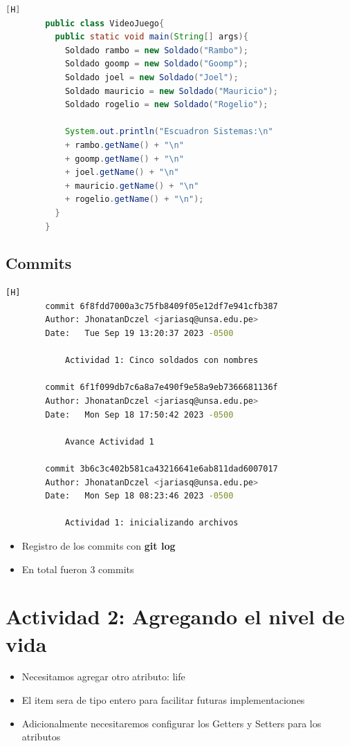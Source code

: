 \documentclass{article}
\begin{document}
	\begin{lstlisting}[language=java,caption={Creando el archivo VideoJuego.java}][H]
        public class VideoJuego{
          public static void main(String[] args){
            Soldado rambo = new Soldado("Rambo");
            Soldado goomp = new Soldado("Goomp");
            Soldado joel = new Soldado("Joel");
            Soldado mauricio = new Soldado("Mauricio");
            Soldado rogelio = new Soldado("Rogelio");
            
            System.out.println("Escuadron Sistemas:\n" 
            + rambo.getName() + "\n" 
            + goomp.getName() + "\n" 
            + joel.getName() + "\n" 
            + mauricio.getName() + "\n" 
            + rogelio.getName() + "\n");
          }
        }
	\end{lstlisting}	
	
	\subsection{Commits}
	\begin{lstlisting}[language=bash,caption={Primer Commit Creando carpeta/archivo para laboratorio 01}][H]
        commit 6f8fdd7000a3c75fb8409f05e12df7e941cfb387
        Author: JhonatanDczel <jariasq@unsa.edu.pe>
        Date:   Tue Sep 19 13:20:37 2023 -0500
        
            Actividad 1: Cinco soldados con nombres
        
        commit 6f1f099db7c6a8a7e490f9e58a9eb7366681136f
        Author: JhonatanDczel <jariasq@unsa.edu.pe>
        Date:   Mon Sep 18 17:50:42 2023 -0500
        
            Avance Actividad 1
        
        commit 3b6c3c402b581ca43216641e6ab811dad6007017
        Author: JhonatanDczel <jariasq@unsa.edu.pe>
        Date:   Mon Sep 18 08:23:46 2023 -0500
        
            Actividad 1: inicializando archivos
	\end{lstlisting}
	\begin{itemize}
	    \item Registro de los commits con \textbf{git log}
            \item En total fueron 3 commits
	\end{itemize}
    
        \section{Actividad 2: Agregando el nivel de vida}
	\begin{itemize}
		\item Necesitamos agregar otro atributo: life
            \item El item sera de tipo entero para facilitar futuras implementaciones
            \item Adicionalmente necesitaremos configurar los Getters y Setters para los atributos
	\end{itemize}		
\end{document}
